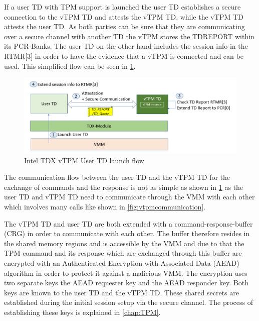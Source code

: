 \documentclass[sigplan,screen,nonacm]{acmart}
\begin{document}
If a user TD with TPM support is launched the user TD establishes a secure connection to the vTPM TD and attests the vTPM TD, while the vTPM TD attests the user TD.
As both parties can be sure that they are communicating over a secure channel with another TD the vTPM stores the TDREPORT within its PCR-Banks.
The user TD on the other hand includes the session info in the RTMR[3] in order to have the evidence that a vTPM is connected and can be used.
This simplified flow can be seen in \cref{fig:vtpmlaunchusertd}.

\begin{figure}
  \centering
  \includegraphics[width=\linewidth]{pictures/vTPM_TD_launch.png}
  \caption{Intel TDX vTPM User TD launch flow \cite{Intel-vTPM}}
  \label{fig:vtpmlaunchusertd}
\end{figure}

 The communication flow between the user TD and the vTPM TD for the exchange of commands and the response is not as simple as shown in \cref{fig:vtpmlaunchusertd} as the user TD and vTPM TD need to communicate through the VMM with each other which involves many calls like shown in \cref{fig:vtpmcommunication}.

The vTPM TD and user TD are both extended with a command-response-buffer (CRG) in order to communicate with each other.
The buffer therefore resides in the shared memory regions and is accessible by the VMM and due to that the TPM command and its response which are exchanged through this buffer are encrypted with an Authenticated Encryption with Associated Data (AEAD) algorithm in order to protect it against a malicious VMM.
The encryption uses two separate keys the AEAD requester key and the AEAD responder key.
Both keys are known to the user TD and the vTPM TD.
These shared secrets are established during the initial session setup via the secure channel.
The process of establishing these keys is explained in \cref{chap:TPM}.
\end{document}
